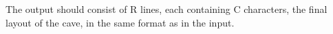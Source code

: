 The output should consist of R lines, each containing C characters, the final layout of the cave, in the same format as in the input.  

\